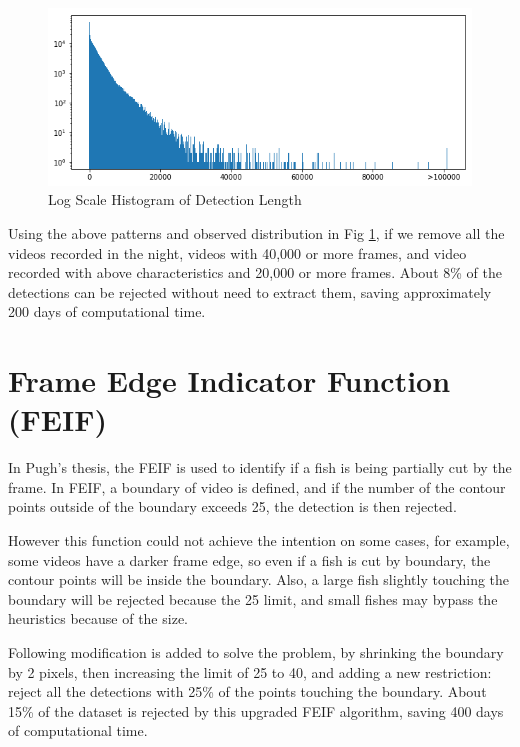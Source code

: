 \documentclass[bsc,logo,twoside,fullspacing,parskip]{infthesis}
\begin{document}
\begin{figure}[h]
\centering
    \includegraphics[scale=0.40]{graph/frame_distribution.png}
    \caption{Log Scale Histogram of Detection Length}
    \label{fig:vidlength}
\end{figure}

Using the above patterns and observed distribution in Fig \ref{fig:vidlength}, if we remove all the videos recorded in the night, videos with 40,000 or more frames, and video recorded with above characteristics and 20,000 or more frames. About 8\% of the detections can be rejected without need to extract them, saving approximately 200 days of computational time.


\section{Frame Edge Indicator Function (FEIF)}

In Pugh's thesis\cite{P1}, the FEIF is used to identify if a fish is being partially cut by the frame. In FEIF, a boundary of video is defined, and if the number of the contour points outside of the boundary exceeds 25, the detection is then rejected.

However this function could not achieve the intention on some cases, for example, some videos have a darker frame edge, so even if a fish is cut by boundary, the contour points will be inside the boundary. Also, a large fish slightly touching the boundary will be rejected because the 25 limit, and small fishes may bypass the heuristics because of the size.

Following modification is added to solve the problem, by shrinking the boundary by 2 pixels, then increasing the limit of 25 to 40, and adding a new restriction: reject all the detections with 25\% of the points touching the boundary. About 15\% of the dataset is rejected by this upgraded FEIF algorithm, saving 400 days of computational time.
\end{document}
